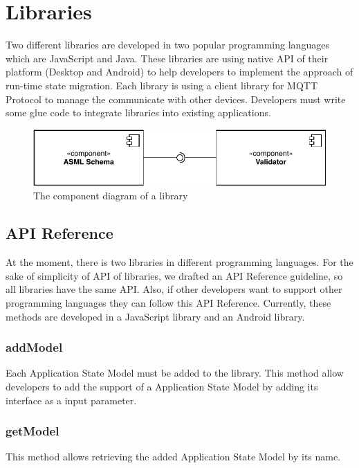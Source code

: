 \section{Libraries}
Two different libraries are developed in two popular programming languages which are JavaScript and Java. These libraries are using native API of their platform (Desktop and Android) to help developers to implement the approach of run-time state migration. Each library is using a client library for MQTT Protocol to manage the communicate with other devices. Developers must write some glue code to integrate libraries into existing applications.

\FloatBarrier
\begin{figure}[H]
    \includegraphics[width=\linewidth]{../figures/libraries-diagram}
    \centering
    \caption{The component diagram of a library}
    \label{fig:mvp}
\end{figure}
\FloatBarrier

\subsection{API Reference}
At the moment, there is two libraries in different programming languages. For the sake of simplicity of API of libraries, we drafted an API Reference guideline, so all libraries have the same API. Also, if other developers want to support other programming languages they can follow this API Reference. Currently, these methods are developed in a JavaScript library and an Android library.

\subsubsection{addModel}
Each Application State Model must be added to the library. This method allow developers to add the support of a Application State Model by adding its interface as a input parameter.

\subsubsection{getModel}
This method allows retrieving the added Application State Model by its name.

